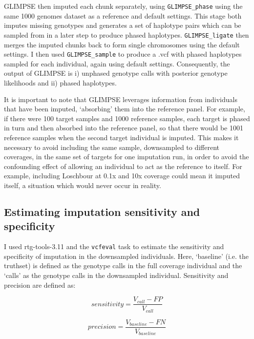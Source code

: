 {GLIMPSE then imputed each chunk separately, using \texttt{GLIMPSE\_phase} using the same 1000 genomes dataset as a reference and default settings. This stage both imputes missing genotypes and generates a set of haplotype pairs which can be sampled from in a later step to produce phased haplotypes. \texttt{GLIMPSE\_ligate} then merges the imputed chunks back to form single chromosomes using the default settings. I then used \texttt{GLIMPSE\_sample} to produce a .vcf with phased haplotypes sampled for each individual, again using default settings. Consequently, the output of GLIMPSE is i) unphased genotype calls with posterior genotype likelihoods and ii) phased haplotypes.

It is important to note that GLIMPSE leverages information from individuals that have been imputed, `absorbing' them into the reference panel. For example, if there were 100 target samples and 1000 reference samples, each target is phased in turn and then absorbed into the reference panel, so that there would be 1001 reference samples when the second target individual is imputed. This makes it necessary to avoid including the same sample, downsampled to different coverages, in the same set of targets for one imputation run, in order to avoid the confounding effect of allowing an individual to act as the reference to itself. For example, including Loschbour at 0.1x and 10x coverage could mean it imputed itself, a situation which would never occur in reality. 


\subsection{Estimating imputation sensitivity and specificity}

I used rtg-tools-3.11 \cite{cleary2014joint} and the \texttt{vcfeval} task to estimate the sensitivity and specificity of imputation in the downsampled individuals. Here, `baseline' (i.e. the truthset) is defined as the genotype calls in the full coverage individual and the `calls' as the genotype calls in the downsampled individual. Sensitivity and precision are defined as: 

\begin{equation}
sensitivity = \frac{V_{call}-FP}{V_{call}}
\end{equation}

\begin{equation}
precision = \frac{V_{baseline}-FN}{V_{baseline}}
\end{equation}

}
